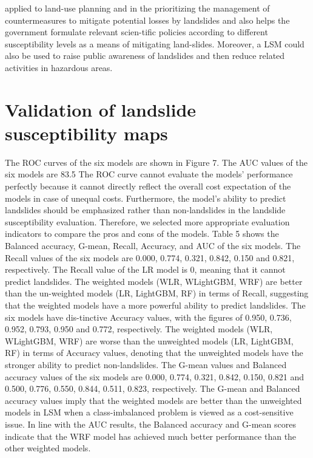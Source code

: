 \documentclass[a4paper,fleqn]{cas-sc}
\begin{document}
applied to land-use planning and in the prioritizing the management of countermeasures to mitigate potential losses by landslides and also helps the government formulate relevant scien-tific policies according to different susceptibility levels as a means of mitigating land-slides. Moreover, a LSM could also be used to raise public awareness of landslides and then reduce related activities in hazardous areas.

\section{Validation of landslide susceptibility maps}

The ROC curves of the six models are shown in Figure 7. The AUC values of the six models are 83.5%
The ROC curve cannot evaluate the models' performance perfectly because it cannot directly reflect the overall cost expectation of the models in case of unequal costs. Furthermore, the model's ability to predict landslides should be emphasized rather than non-landslides in the landslide susceptibility evaluation. Therefore, we selected more appropriate evaluation indicators to compare the pros and cons of the models. Table 5 shows the Balanced accuracy, G-mean, Recall, Accuracy, and AUC of the six models. The Recall values of the six models are 0.000, 0.774, 0.321, 0.842, 0.150 and 0.821, respectively. The Recall value of the LR model is 0, meaning that it cannot predict landslides. The weighted models (WLR, WLightGBM, WRF) are better than the un-weighted models (LR, LightGBM, RF) in terms of Recall, suggesting that the weighted models have a more powerful ability to predict landslides. The six models have dis-tinctive Accuracy values, with the figures of 0.950, 0.736, 0.952, 0.793, 0.950 and 0.772, respectively. The weighted models (WLR, WLightGBM, WRF) are worse than the unweighted models (LR, LightGBM, RF) in terms of Accuracy values, denoting that the unweighted models have the stronger ability to predict non-landslides. The G-mean values and Balanced accuracy values of the six models are 0.000, 0.774, 0.321, 0.842, 0.150, 0.821 and 0.500, 0.776, 0.550, 0.844, 0.511, 0.823, respectively. The G-mean and Balanced accuracy values imply that the weighted models are better than the unweighted models in LSM when a class-imbalanced problem is viewed as a cost-sensitive issue. In line with the AUC results, the Balanced accuracy and G-mean scores indicate that the WRF model has achieved much better performance than the other weighted models.
\end{document}
